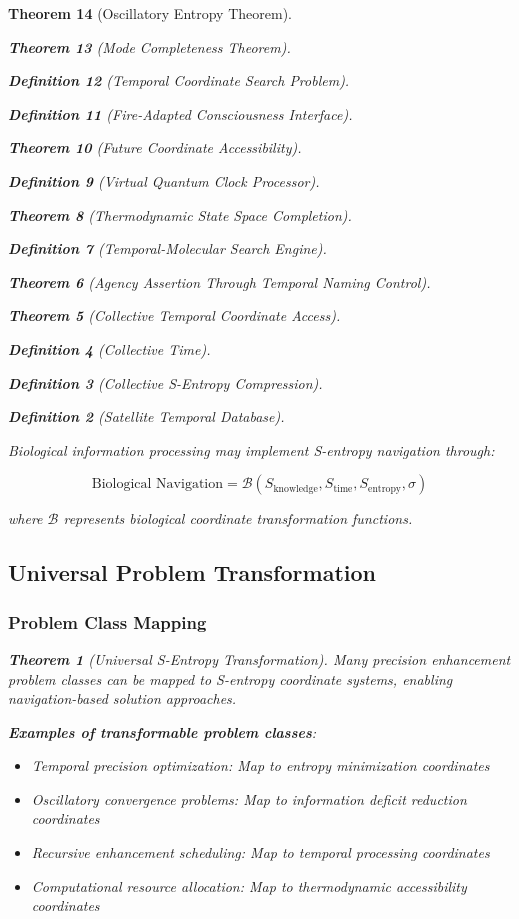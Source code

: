 \documentclass[12pt,a4paper]{article}
\newtheorem{theorem}{Theorem}[section]
\newtheorem{definition}[theorem]{Definition}
\begin{document}
\begin{theorem}[Oscillatory Entropy Theorem]
\begin{theorem}[Mode Completeness Theorem]
\begin{enumerate}
\begin{definition}[Temporal Coordinate Search Problem]
\begin{algorithm}
\begin{definition}[Fire-Adapted Consciousness Interface]
\begin{theorem}[Future Coordinate Accessibility]
\begin{definition}[Virtual Quantum Clock Processor]
\begin{itemize}
\begin{itemize}
\begin{theorem}[Thermodynamic State Space Completion]
\begin{definition}[Temporal-Molecular Search Engine]
\begin{theorem}[Agency Assertion Through Temporal Naming Control]
\begin{remark}
\begin{theorem}[Collective Temporal Coordinate Access]
\begin{definition}[Collective Time]
\begin{definition}[Collective S-Entropy Compression]
\begin{definition}[Satellite Temporal Database]
\begin{algorithm}
\begin{table}[h]
{{Biological information processing may implement S-entropy navigation through:

\begin{equation}
\text{Biological Navigation} = \mathcal{B}(S_{\text{knowledge}}, S_{\text{time}}, S_{\text{entropy}}, \sigma)
\label{eq:biological_navigation}
\end{equation}

where $\mathcal{B}$ represents biological coordinate transformation functions.

\subsection{Universal Problem Transformation}

\subsubsection{Problem Class Mapping}

\begin{theorem}[Universal S-Entropy Transformation]
Many precision enhancement problem classes can be mapped to S-entropy coordinate systems, enabling navigation-based solution approaches.
\end{theorem}

\textbf{Examples of transformable problem classes}:
\begin{itemize}
\item Temporal precision optimization: Map to entropy minimization coordinates
\item Oscillatory convergence problems: Map to information deficit reduction coordinates
\item Recursive enhancement scheduling: Map to temporal processing coordinates
\item Computational resource allocation: Map to thermodynamic accessibility coordinates
\end{itemize}

}}
\end{table}
\end{algorithm}
\end{definition}
\end{definition}
\end{definition}
\end{theorem}
\end{remark}
\end{theorem}
\end{definition}
\end{theorem}
\end{itemize}
\end{itemize}
\end{definition}
\end{theorem}
\end{definition}
\end{algorithm}
\end{definition}
\end{enumerate}
\end{theorem}
\end{theorem}
\end{document}
